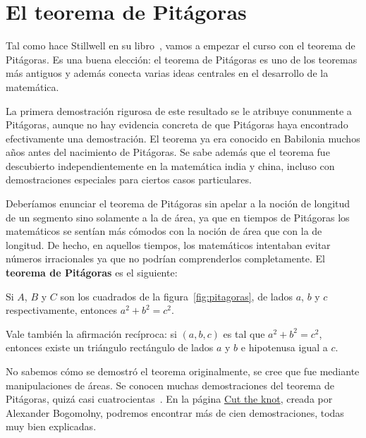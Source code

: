 \chapter{El teorema de Pitágoras}

Tal como hace Stillwell en su libro~\cite{MR2667826}, vamos a empezar el curso
con el teorema de Pitágoras. Es una buena elección: el teorema de Pitágoras es
uno de los teoremas más antiguos y además conecta varias ideas centrales en el
desarrollo de la matemática. 

La primera demostración rigurosa de este resultado se le atribuye conunmente a
Pitágoras, aunque no hay evidencia concreta de que Pitágoras haya encontrado
efectivamente una demostración.  El teorema ya era conocido en Babilonia muchos años 
antes del nacimiento de Pitágoras. Se sabe además que el teorema fue
descubierto independientemente en la matemática india y china, incluso
con demostraciones especiales para ciertos casos particulares. 

Deberíamos enunciar el teorema de Pitágoras sin apelar a la noción de longitud
de un segmento sino solamente a la de área, ya que en tiempos de Pitágoras los
matemáticos se sentían más cómodos con la noción de área que con la de
longitud.  De hecho, en aquellos tiempos, los matemáticos intentaban evitar
números irracionales ya que no podrían comprenderlos completamente. 
El \textbf{teorema de Pitágoras} es el siguiente:

\begin{theorem}[Pitágoras]
Si $A$, $B$ y $C$ son los cuadrados de la figura~\ref{fig:pitagoras}, de
lados $a$, $b$ y $c$ respectivamente, entonces
$a^2+b^2=c^2$.
\end{theorem}

Vale también la afirmación recíproca: si $(a,b,c)$ es tal que $a^2+b^2=c^2$,
entonces existe un triángulo rectángulo de lados $a$ y $b$ e hipotenusa igual a
$c$. 

No sabemos cómo se demostró el teorema originalmente, se cree que fue mediante
manipulaciones de áreas. Se conocen muchas demostraciones del teorema de
Pitágoras, quizá casi cuatrocientas~\cite{loomis1968pythagorean}. 
En la página
\href{http://cut-the-knot.org/}{Cut the knot}, creada por Alexander Bogomolny, podremos
encontrar más de cien demostraciones, todas muy bien explicadas.  


